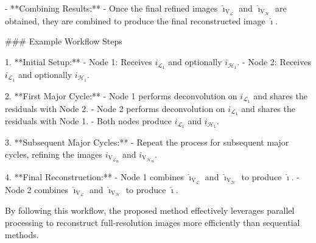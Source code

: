 - **Combining Results:**
  - Once the final refined images \( \hat{\imath}_{\text{V}_\mathcal{L}} \) and \( \hat{\imath}_{\text{V}_\mathcal{H}} \) are obtained, they are combined to produce the final reconstructed image \( \hat{\imath} \).

### Example Workflow Steps

1. **Initial Setup:**
   - Node 1: Receives \( i_{\mathcal{L}_1} \) and optionally \( i_{\mathcal{H}_1} \).
   - Node 2: Receives \( i_{\mathcal{L}_1} \) and optionally \( i_{\mathcal{H}_1} \).

2. **First Major Cycle:**
   - Node 1 performs deconvolution on \( i_{\mathcal{L}_1} \) and shares the residuals with Node 2.
   - Node 2 performs deconvolution on \( i_{\mathcal{L}_1} \) and shares the residuals with Node 1.
   - Both nodes produce \( i_{\mathcal{L}_1} \) and \( i_{\mathcal{H}_1} \).

3. **Subsequent Major Cycles:**
   - Repeat the process for subsequent major cycles, refining the images \( i_{{\text{V}_\mathcal{L}}_n} \) and \( i_{{\text{V}_\mathcal{H}}_n} \).

4. **Final Reconstruction:**
   - Node 1 combines \( \hat{\imath}_{\text{V}_\mathcal{L}} \) and \( \hat{\imath}_{\text{V}_\mathcal{H}} \) to produce \( \hat{\imath} \).
   - Node 2 combines \( \hat{\imath}_{\text{V}_\mathcal{L}} \) and \( \hat{\imath}_{\text{V}_\mathcal{H}} \) to produce \( \hat{\imath} \).

By following this workflow, the proposed method effectively leverages parallel processing to reconstruct full-resolution images more efficiently than sequential methods.